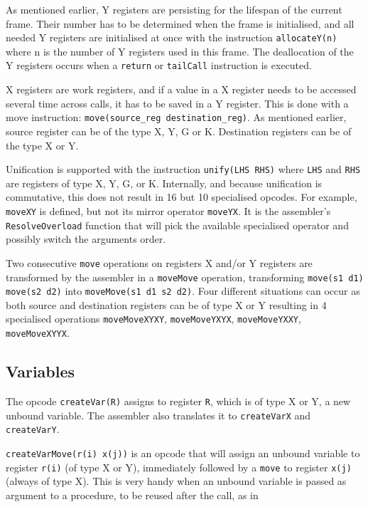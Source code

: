 \documentclass[a4paper]{memoir}
\begin{document}
As mentioned earlier, Y registers are persisting for the lifespan of the current frame. Their number has to be determined when the frame is initialised, and all needed Y registers are initialised at once with the instruction \lstinline!allocateY(n)! where n is the number of Y registers used in this frame.
The deallocation of the Y registers occurs when a \lstinline!return! or
\lstinline!tailCall! instruction is executed.

X registers are work registers, and if a value in a X register needs to be accessed several time across calls, it has to be saved in a Y register. This is done with a move instruction: \lstinline!move(source_reg destination_reg)!.
As mentioned earlier, source
register can be of the type X, Y, G or K. Destination registers can be of the
type X or Y.

Unification is supported with the instruction \lstinline!unify(LHS RHS)! where
\lstinline!LHS! and \lstinline!RHS! are registers of type X, Y, G, or K.
Internally, and because unification is commutative, this does not result in 16 but 10 specialised opcodes. For example,
\lstinline!moveXY! is defined, but not its mirror operator \lstinline!moveYX!.
It is the assembler's \lstinline!ResolveOverload! function that will pick the
available specialised operator and possibly switch the arguments order.

Two consecutive \lstinline!move! operations on registers X and/or Y registers are transformed by the assembler in
a \lstinline!moveMove! operation, transforming \lstinline!move(s1 d1) move(s2 d2)! into
\lstinline!moveMove(s1 d1 s2 d2)!. Four different situations can occur as both
source and destination registers can be of type X or Y resulting in 4
specialised operations \lstinline!moveMoveXYXY!, \lstinline!moveMoveYXYX!, \lstinline!moveMoveYXXY!,
\lstinline!moveMoveXYYX!.


\subsection{Variables}\label{sec:opcode:variables}
The opcode \lstinline!createVar(R)! assigns to register \lstinline!R!, which is
of type X or Y, a new unbound variable. The assembler also translates it to
\lstinline!createVarX! and \lstinline!createVarY!.

\lstinline!createVarMove(r(i) x(j))! is an opcode that will assign an unbound variable to
register \lstinline!r(i)! (of type X or Y), immediately followed by a
\lstinline!move! to register \lstinline!x(j)! (always of type X). This is very
handy when an unbound variable is passed as argument to a procedure, to be
reused after the call, as in
\end{document}
